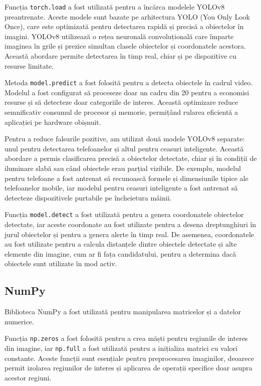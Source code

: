 \documentclass[12pt,a4paper]{article}
\begin{document}
Funcția \texttt{torch.load} a fost utilizată pentru a încărca modelele YOLOv8 preantrenate. Aceste modele sunt bazate pe arhitectura YOLO (You Only Look Once), care este optimizată pentru detectarea rapidă și precisă a obiectelor în imagini\cite{redmon2018yolov3}. YOLOv8 utilizează o rețea neuronală convoluțională care împarte imaginea în grile și prezice simultan clasele obiectelor și coordonatele acestora. Această abordare permite detectarea în timp real, chiar și pe dispozitive cu resurse limitate.

Metoda \texttt{model.predict} a fost folosită pentru a detecta obiectele în cadrul video. Modelul a fost configurat să proceseze doar un cadru din 20 pentru a economisi resurse și să detecteze doar categoriile de interes. Această optimizare reduce semnificativ consumul de procesor și memorie, permițând rularea eficientă a aplicației pe hardware obișnuit.

Pentru a reduce falsurile pozitive, am utilizat două modele YOLOv8 separate: unul pentru detectarea telefoanelor și altul pentru ceasuri inteligente. Această abordare a permis clasificarea precisă a obiectelor detectate, chiar și în condiții de iluminare slabă sau când obiectele erau parțial vizibile. De exemplu, modelul pentru telefoane a fost antrenat să recunoască formele și dimensiunile tipice ale telefoanelor mobile, iar modelul pentru ceasuri inteligente a fost antrenat să detecteze dispozitivele purtabile pe încheietura mâinii.

Funcția \texttt{model.detect} a fost utilizată pentru a genera coordonatele obiectelor detectate, iar aceste coordonate au fost utilizate pentru a desena dreptunghiuri în jurul obiectelor și pentru a genera alerte în timp real. De asemenea, coordonatele au fost utilizate pentru a calcula distanțele dintre obiectele detectate și alte elemente din imagine, cum ar fi fața candidatului, pentru a determina dacă obiectele sunt utilizate în mod activ.

\subsection{NumPy}
Biblioteca NumPy a fost utilizată pentru manipularea matricelor și a datelor numerice\cite{harris2020array}. 

Funcția \texttt{np.zeros} a fost folosită pentru a crea măști pentru regiunile de interes din imagine, iar \texttt{np.full} a fost utilizată pentru a inițializa matrici cu valori constante. Aceste funcții sunt esențiale pentru preprocesarea imaginilor, deoarece permit izolarea regiunilor de interes și aplicarea de operații specifice doar asupra acestor regiuni\cite{goodfellow2016deep}.
\end{document}
